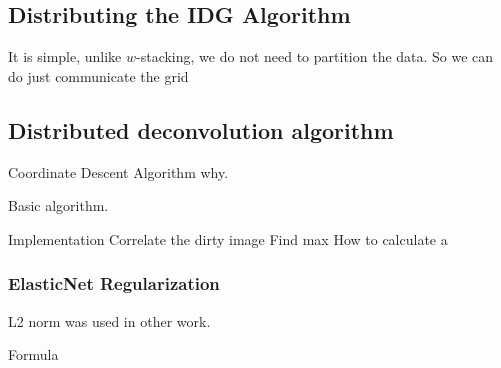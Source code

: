\subsection{Distributing the IDG Algorithm}\label{distribution:idg}
It is simple, unlike $w$-stacking, we do not need to partition the data. So we can do just communicate the grid



\subsection{Distributed deconvolution algorithm}

Coordinate Descent Algorithm why.

Basic algorithm.


Implementation
Correlate the dirty image
Find max
How to calculate a

\subsubsection{ElasticNet Regularization}
L2 norm was used in other work. \cite{Ferrari}


Formula

